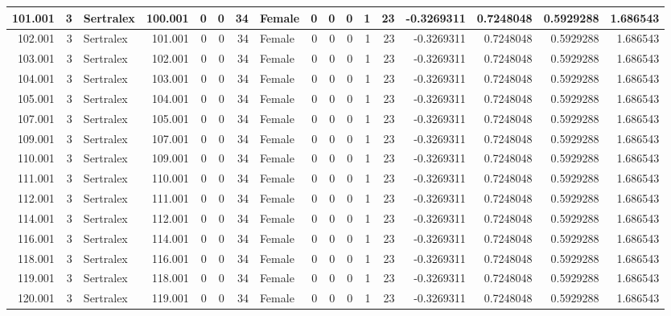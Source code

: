 \documentclass[
]{book}
\begin{document}
\begin{table}
\begin{tabular}[t]{r|r|l|r|r|r|r|l|r|r|r|r|r|r|r|r|r}
\hline
101.001 & 3 & Sertralex & 100.001 & 0 & 0 & 34 & Female & 0 & 0 & 0 & 1 & 23 & -0.3269311 & 0.7248048 & 0.5929288 & 1.686543\\
\hline
102.001 & 3 & Sertralex & 101.001 & 0 & 0 & 34 & Female & 0 & 0 & 0 & 1 & 23 & -0.3269311 & 0.7248048 & 0.5929288 & 1.686543\\
\hline
103.001 & 3 & Sertralex & 102.001 & 0 & 0 & 34 & Female & 0 & 0 & 0 & 1 & 23 & -0.3269311 & 0.7248048 & 0.5929288 & 1.686543\\
\hline
104.001 & 3 & Sertralex & 103.001 & 0 & 0 & 34 & Female & 0 & 0 & 0 & 1 & 23 & -0.3269311 & 0.7248048 & 0.5929288 & 1.686543\\
\hline
105.001 & 3 & Sertralex & 104.001 & 0 & 0 & 34 & Female & 0 & 0 & 0 & 1 & 23 & -0.3269311 & 0.7248048 & 0.5929288 & 1.686543\\
\hline
107.001 & 3 & Sertralex & 105.001 & 0 & 0 & 34 & Female & 0 & 0 & 0 & 1 & 23 & -0.3269311 & 0.7248048 & 0.5929288 & 1.686543\\
\hline
109.001 & 3 & Sertralex & 107.001 & 0 & 0 & 34 & Female & 0 & 0 & 0 & 1 & 23 & -0.3269311 & 0.7248048 & 0.5929288 & 1.686543\\
\hline
110.001 & 3 & Sertralex & 109.001 & 0 & 0 & 34 & Female & 0 & 0 & 0 & 1 & 23 & -0.3269311 & 0.7248048 & 0.5929288 & 1.686543\\
\hline
111.001 & 3 & Sertralex & 110.001 & 0 & 0 & 34 & Female & 0 & 0 & 0 & 1 & 23 & -0.3269311 & 0.7248048 & 0.5929288 & 1.686543\\
\hline
112.001 & 3 & Sertralex & 111.001 & 0 & 0 & 34 & Female & 0 & 0 & 0 & 1 & 23 & -0.3269311 & 0.7248048 & 0.5929288 & 1.686543\\
\hline
114.001 & 3 & Sertralex & 112.001 & 0 & 0 & 34 & Female & 0 & 0 & 0 & 1 & 23 & -0.3269311 & 0.7248048 & 0.5929288 & 1.686543\\
\hline
116.001 & 3 & Sertralex & 114.001 & 0 & 0 & 34 & Female & 0 & 0 & 0 & 1 & 23 & -0.3269311 & 0.7248048 & 0.5929288 & 1.686543\\
\hline
118.001 & 3 & Sertralex & 116.001 & 0 & 0 & 34 & Female & 0 & 0 & 0 & 1 & 23 & -0.3269311 & 0.7248048 & 0.5929288 & 1.686543\\
\hline
119.001 & 3 & Sertralex & 118.001 & 0 & 0 & 34 & Female & 0 & 0 & 0 & 1 & 23 & -0.3269311 & 0.7248048 & 0.5929288 & 1.686543\\
\hline
120.001 & 3 & Sertralex & 119.001 & 0 & 0 & 34 & Female & 0 & 0 & 0 & 1 & 23 & -0.3269311 & 0.7248048 & 0.5929288 & 1.686543\\

\end{tabular}
\end{table}
\end{document}

